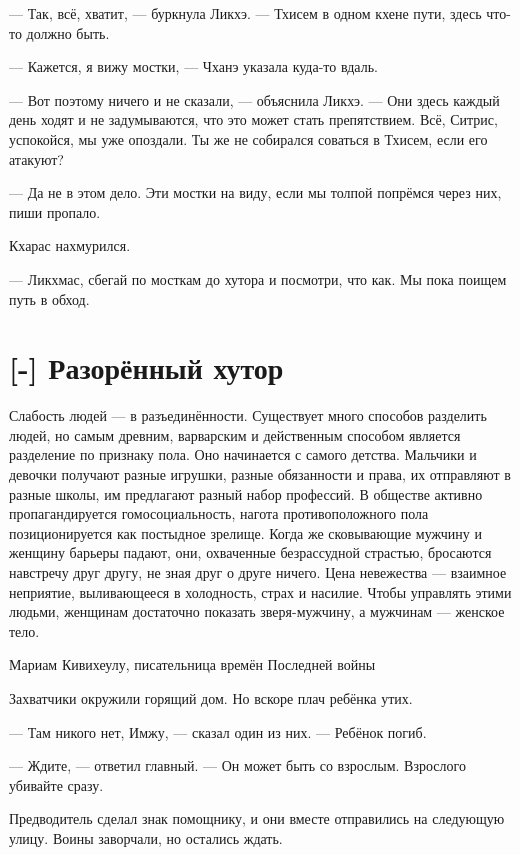 --- Так, всё, хватит, --- буркнула Ликхэ.
--- Тхисем в одном кхене пути, здесь что-то должно быть.

--- Кажется, я вижу мостки, --- Чханэ указала куда-то вдаль.

--- Вот поэтому ничего и не сказали, --- объяснила Ликхэ.
--- Они здесь каждый день ходят и не задумываются, что это может стать препятствием.
Всё, Ситрис, успокойся, мы уже опоздали.
Ты же не собирался соваться в Тхисем, если его атакуют?

--- Да не в этом дело.
Эти мостки на виду, если мы толпой попрёмся через них, пиши пропало.

Кхарас нахмурился.

--- Ликхмас, сбегай по мосткам до хутора и посмотри, что как.
Мы пока поищем путь в обход.

\textspace

\section{[-] Разорённый хутор}

\epigraph
{Слабость людей --- в разъединённости.
Существует много способов разделить людей, но самым древним, варварским и действенным способом является разделение по признаку пола.
Оно начинается с самого детства.
Мальчики и девочки получают разные игрушки, разные обязанности и права, их отправляют в разные школы, им предлагают разный набор профессий.
В обществе активно пропагандируется гомосоциальность, нагота противоположного пола позиционируется как постыдное зрелище.
Когда же сковывающие мужчину и женщину барьеры падают, они, охваченные безрассудной страстью, бросаются навстречу друг другу, не зная друг о друге ничего.
Цена невежества --- взаимное неприятие, выливающееся в холодность, страх и насилие.
Чтобы управлять этими людьми, женщинам достаточно показать зверя-мужчину, а мужчинам --- женское тело.}
{Мариам Кивихеулу, писательница времён Последней войны}

\textspace

Захватчики окружили горящий дом.
Но вскоре плач ребёнка утих.

--- Там никого нет, Имжу, --- сказал один из них.
--- Ребёнок погиб.

--- Ждите, --- ответил главный.
--- Он может быть со взрослым.
Взрослого убивайте сразу.

Предводитель сделал знак помощнику, и они вместе отправились на следующую улицу.
Воины заворчали, но остались ждать.

